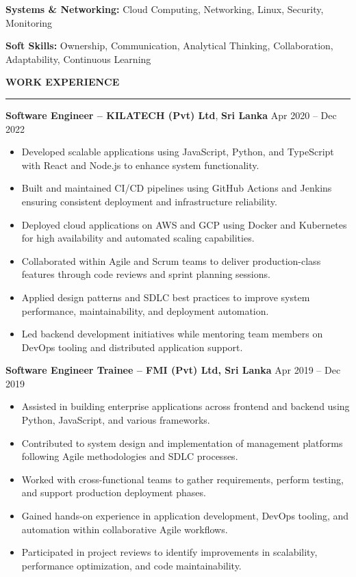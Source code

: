 \documentclass[10pt,letterpaper]{article}
\begin{document}
\textbf{Systems \& Networking:} Cloud Computing, Networking, Linux, Security, Monitoring

\textbf{Soft Skills:} Ownership, Communication, Analytical Thinking, Collaboration, Adaptability, Continuous Learning

\vspace{8pt}

\textbf{WORK EXPERIENCE}\\[-8pt]
\noindent\rule{\textwidth}{1pt}

\vspace{-2pt}

\textbf{Software Engineer -- KILATECH (Pvt) Ltd}, \textbf{Sri Lanka} \hfill Apr 2020 -- Dec 2022

\vspace{-1pt}

\begin{itemize}
\item Developed scalable applications using JavaScript, Python, and TypeScript with React and Node.js to enhance system functionality.
\item Built and maintained CI/CD pipelines using GitHub Actions and Jenkins ensuring consistent deployment and infrastructure reliability.
\item Deployed cloud applications on AWS and GCP using Docker and Kubernetes for high availability and automated scaling capabilities.
\item Collaborated within Agile and Scrum teams to deliver production-class features through code reviews and sprint planning sessions.
\item Applied design patterns and SDLC best practices to improve system performance, maintainability, and deployment automation.
\item Led backend development initiatives while mentoring team members on DevOps tooling and distributed application support.
\end{itemize}

\textbf{Software Engineer Trainee -- FMI (Pvt) Ltd, Sri Lanka} \hfill Apr 2019 -- Dec 2019

\vspace{-1pt}

\begin{itemize}
\item Assisted in building enterprise applications across frontend and backend using Python, JavaScript, and various frameworks.
\item Contributed to system design and implementation of management platforms following Agile methodologies and SDLC processes.
\item Worked with cross-functional teams to gather requirements, perform testing, and support production deployment phases.
\item Gained hands-on experience in application development, DevOps tooling, and automation within collaborative Agile workflows.
\item Participated in project reviews to identify improvements in scalability, performance optimization, and code maintainability.
\end{itemize}
\end{document}
